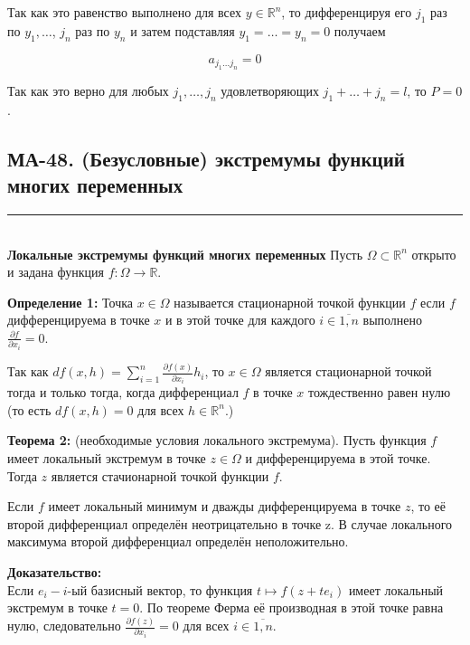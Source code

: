 \documentclass[a4paper,12pt]{article} %
\newcommand{\HRule}{\rule{\linewidth}{0.5mm}}
\begin{document}
Так как это равенство выполнено для всех $y \in \mathbb{R}^{n}$, то дифференцируя его $j_{1}$ раз по $y_{1}, \ldots$, $j_{n}$ раз по $y_{n}$ и затем подставляя $y_{1}=\ldots=y_{n}=0$ получаем

$$
a_{j_{1} \ldots j_{n}}=0
$$

Так как это верно для любых $j_{1}, \ldots, j_{n}$ удовлетворяющих $j_{1}+\ldots+j_{n}=l$, то $P=0$.




\newpage
\begin{LARGE}
\begin{center}
	\section{МА-48. (Безусловные) экстремумы функций многих переменных }
\end{center}
\end{LARGE}
\HRule \\


\textbf{Локальные экстремумы функций многих переменных}
Пусть $\Omega \subset \mathbb{R}^{n}$ открыто и задана функция $f: \Omega \rightarrow \mathbb{R}$.

\textbf{Определение 1:} Точка $x \in \Omega$ называется стационарной точкой функции $f$ если $f$ дифференцируема в точке $x$ и в этой точке для каждого $i \in \overline{1, n}$ выполнено $\frac{\partial f}{\partial x_{i}}=0$.

Так как $d f(x, h)=\sum_{i=1}^{n} \frac{\partial f(x)}{\partial x_{i}} h_{i}$, то $x \in \Omega$ является стационарной точкой тогда и только тогда, когда дифференциал $f$ в точке $x$ тождественно равен нулю (то есть $d f(x, h)=0$ для всех $h \in \mathbb{R}^{n}$.)

\textbf{Теорема 2:} (необходимые условия локального экстремума). Пусть функция $f$ имеет локальный экстремум в точке $z \in \Omega$ и дифференцируема в этой точке. Тогда $z$ является стачионарной точкой функции $f$.

Если $f$ имеет локальный минимум и дважды дифференцируема в точке $z$, то её второй дифференциал определён неотрицательно в точке z. В случае локального максимума второй дифференциал определён неположительно.

\textbf{Доказательство:}\\
Если $e_{i}-i$-ый базисный вектор, то функция $t \mapsto f\left(z+t e_{i}\right)$ имеет локальный экстремум в точке $t=0$. По теореме Ферма её производная в этой точке равна нулю, следовательно $\frac{\partial f(z)}{\partial x_{i}}=0$ для всех $i \in \overline{1, n}$.
\end{document}
